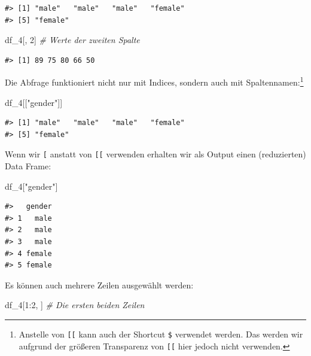 \documentclass[]{tufte-book}
\newenvironment{Shaded}{}{}
\newcommand{\DecValTok}[1]{\textcolor[rgb]{0.25,0.63,0.44}{#1}}
\newcommand{\StringTok}[1]{\textcolor[rgb]{0.25,0.44,0.63}{#1}}
\newcommand{\CommentTok}[1]{\textcolor[rgb]{0.38,0.63,0.69}{\textit{#1}}}
\newcommand{\OperatorTok}[1]{\textcolor[rgb]{0.40,0.40,0.40}{#1}}
\newcommand{\NormalTok}[1]{#1}
\begin{document}
\begin{verbatim}
#> [1] "male"   "male"   "male"   "female"
#> [5] "female"
\end{verbatim}

\begin{Shaded}
\begin{Highlighting}[]
\NormalTok{df_}\DecValTok{4}\NormalTok{[, }\DecValTok{2}\NormalTok{]  }\CommentTok{# Werte der zweiten Spalte}
\end{Highlighting}
\end{Shaded}

\begin{verbatim}
#> [1] 89 75 80 66 50
\end{verbatim}

Die Abfrage funktioniert nicht nur mit Indices, sondern auch mit
Spaltennamen:\footnote{Anstelle von \texttt{{[}{[}} kann auch der
  Shortcut \texttt{\$} verwendet werden. Das werden wir aufgrund der
  größeren Transparenz von \texttt{{[}{[}} hier jedoch nicht verwenden.}

\begin{Shaded}
\begin{Highlighting}[]
\NormalTok{df_}\DecValTok{4}\NormalTok{[[}\StringTok{"gender"}\NormalTok{]]}
\end{Highlighting}
\end{Shaded}

\begin{verbatim}
#> [1] "male"   "male"   "male"   "female"
#> [5] "female"
\end{verbatim}

Wenn wir \texttt{{[}} anstatt von \texttt{{[}{[}} verwenden erhalten wir
als Output einen (reduzierten) Data Frame:

\begin{Shaded}
\begin{Highlighting}[]
\NormalTok{df_}\DecValTok{4}\NormalTok{[}\StringTok{"gender"}\NormalTok{]}
\end{Highlighting}
\end{Shaded}

\begin{verbatim}
#>   gender
#> 1   male
#> 2   male
#> 3   male
#> 4 female
#> 5 female
\end{verbatim}

Es können auch mehrere Zeilen ausgewählt werden:

\begin{Shaded}
\begin{Highlighting}[]
\NormalTok{df_}\DecValTok{4}\NormalTok{[}\DecValTok{1}\OperatorTok{:}\DecValTok{2}\NormalTok{, ]  }\CommentTok{# Die ersten beiden Zeilen}
\end{Highlighting}
\end{Shaded}
\end{document}
